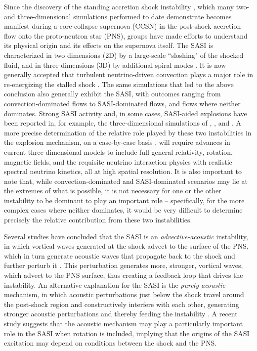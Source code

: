 Since the discovery of the standing accretion shock instability
\citep[SASI;][]{bmd2003}, which many two- and three-dimensional simulations
performed to date demonstrate becomes manifest during a
core-collapse supernova (CCSN) in the post-shock accretion flow
onto the proto-neutron star (PNS),
groups have made efforts to understand its physical origin
and its effects on the supernova itself.
The SASI is characterized in two dimensions (2D) by a large-scale
``sloshing" of the shocked fluid,
and in three dimensions (3D) by additional spiral modes \citep{bm2007}.
It is now generally accepted that turbulent neutrino-driven convection
plays a major role in re-energizing the stalled shock
\citep[e.g., see][]{%
bdm2012,
hmw2013,
mdb2013,
co2015,
mjm2015,
lbh2015,
aor2015,
rco2015,
mjm2015,
mjb2015,
roh2016,
mmh2017,
sjm2018,
rao2018,
oc2018b,
vbr2019,
mth2019,
brv2019,
ytk2019,
pm2020,
sjk2020,
mv2020,
vcb2022,
ntk2022,
mat2022%
}.
The same simulations that led to the above conclusion also generally exhibit
the SASI, with outcomes ranging from convection-dominated flows to
SASI-dominated flows, and flows where neither dominates.
Strong SASI activity and, in some cases, SASI-aided explosions have been
reported in, for example, the three-dimensional simulations of
\cite{sjm2018}, \cite{oc2018b}, and \cite{mat2022}.
A more precise determination of the relative role played by these two
instabilities in the explosion mechanism, on a case-by-case basis
\citep[i.e., for different progenitor characteristics; e.g., see][]{%
sjf2008,
hmm2012,
hmw2013,
co2014,
fmf2014,
mjb2015,
aor2015,
f2015%
}, will require advances in current three-dimensional models to include full
general relativity,
rotation, magnetic fields, and the requisite neutrino interaction physics
with realistic spectral neutrino kinetics, all at high spatial resolution.
It is also important to note that, while
convection-dominated and SASI-dominated scenarios may lie at the extremes of
what is possible, it is not necessary for one or the other instability to be
dominant to play an important role -- specifically, for the more complex cases
where neither dominates,
it would be very difficult
to determine precisely the relative
contribution from these two instabilities.

Several studies have concluded that the SASI is an
{\sl  advective-acoustic} instability, in which
vortical waves generated at the shock advect to the surface of the PNS,
which in turn generate acoustic waves that propagate back to the
shock and further perturb it
\citep{fsj2006,fgs2007,yy2007,l2007,l2008,f2009,gf2012}.
This perturbation generates more, stronger, vortical waves,
which advect to
the PNS surface, thus creating a feedback loop that drives the instability.
An alternative explanation for the SASI is the
{\sl purely acoustic} mechanism, in which
acoustic perturbations just below the shock travel around
the post-shock region and constructively interfere with each other,
generating stronger acoustic perturbations
and thereby feeding the instability
\citep{bm2006}.
A recent study \citep{wft2023} suggests that the acoustic mechanism may play
a particularly important role in the SASI when rotation is included,
implying that the origins of the SASI excitation may depend on conditions
between the shock and the PNS.

